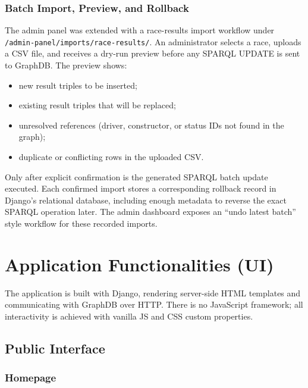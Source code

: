 \documentclass[12pt,a4paper]{article}
\begin{document}
\subsubsection{Batch Import, Preview, and Rollback}

The admin panel was extended with a race-results import workflow under
\texttt{/admin-panel/imports/race-results/}. An administrator selects a race,
uploads a CSV file, and receives a dry-run preview before any SPARQL UPDATE is
sent to GraphDB. The preview shows:

\begin{itemize}[leftmargin=1.5em]
  \item new result triples to be inserted;
  \item existing result triples that will be replaced;
  \item unresolved references (driver, constructor, or status IDs not found in the graph);
  \item duplicate or conflicting rows in the uploaded CSV.
\end{itemize}

Only after explicit confirmation is the generated SPARQL batch update executed.
Each confirmed import stores a corresponding rollback record in Django's
relational database, including enough metadata to reverse the exact SPARQL
operation later. The admin dashboard exposes an ``undo latest batch'' style
workflow for these recorded imports.

\section{Application Functionalities (UI)}

The application is built with Django, rendering server-side HTML templates
and communicating with GraphDB over HTTP. There is no JavaScript framework; all
interactivity is achieved with vanilla JS and CSS custom properties.

\subsection{Public Interface}

\subsubsection{Homepage}
\end{document}
